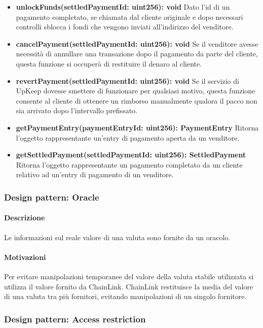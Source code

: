 \documentclass[a4paper, 12pt]{article}
\begin{document}
\begin{itemize}
    \item \textbf{unlockFunds(settledPaymentId: uint256): void}
    Dato l'id di un pagamento completato, se chiamata dal cliente originale e dopo necessari controlli sblocca i fondi che vengono inviati all'indirizzo del venditore.\\
    \item \textbf{cancelPayment(settledPaymentId: uint256): void}
    Se il venditore avesse necessità di annullare una transazione dopo il pagamento da parte del cliente, questa funzione si occuperà di restituire il denaro al cliente.\\
    \item \textbf{revertPayment(settledPaymentId: uint256): void}
    Se il servizio di UpKeep dovesse smettere di funzionare per qualsiasi motivo, questa funzione consente al cliente di ottenere un rimborso manualmente qualora il pacco non sia arrivato dopo l'intervallo prefissato.\\
    \item \textbf{getPaymentEntry(paymentEntryId: uint256): PaymentEntry}
    Ritorna l'oggetto rappresentante un'entry di pagamento aperta da un venditore.\\
    \item \textbf{getSettledPayment(settledPaymentId: uint256): SettledPayment}
    Ritorna l'oggetto rappresentante un pagamento completato da un cliente relativo ad un'entry di pagamento di un venditore.\\

\end{itemize}
\subsubsection{Design pattern: Oracle}
\paragraph{Descrizione}
Le informazioni sul reale valore di una valuta sono fornite da un oracolo.
\paragraph{Motivazioni}
Per evitare manipolazioni temporanee del valore della valuta stabile utilizzata si utilizza il valore fornito da ChainLink.
ChainLink restituisce la media del valore di una valuta tra più fornitori, evitando manipolazioni di un singolo fornitore.
\subsubsection{Design pattern: Access restriction}
\end{document}
